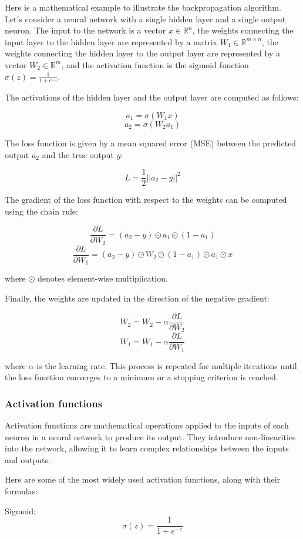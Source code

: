 \documentclass[12pt, a4paper, oneside]{article}
\begin{document}
Here is a mathematical example to illustrate the backpropagation algorithm. Let's consider a neural network with a single hidden layer and a single output neuron. The input to the network is a vector $x \in \mathbb{R}^n$, the weights connecting the input layer to the hidden layer are represented by a matrix $W_1 \in \mathbb{R}^{m \times n}$, the weights connecting the hidden layer to the output layer are represented by a vector $W_2 \in \mathbb{R}^m$, and the activation function is the sigmoid function $\sigma(z) = \frac{1}{1 + e^{-z}}$.

The activations of the hidden layer and the output layer are computed as follows:

$$ a_1 = \sigma(W_1x) $$
$$ a_2 = \sigma(W_2a_1) $$

The loss function is given by a mean squared error (MSE) between the predicted output $a_2$ and the true output $y$:

$$ L = \frac{1}{2} ||a_2 - y||^2 $$

The gradient of the loss function with respect to the weights can be computed using the chain rule:

$$ \frac{\partial L}{\partial W_2} = (a_2 - y) \odot a_1 \odot (1 - a_1) $$
$$ \frac{\partial L}{\partial W_1} = (a_2 - y) \odot W_2 \odot (1 - a_1) \odot a_1 \odot x $$

where $\odot$ denotes element-wise multiplication.

Finally, the weights are updated in the direction of the negative gradient:

$$ W_2 = W_2 - \alpha \frac{\partial L}{\partial W_2} $$
$$ W_1 = W_1 - \alpha \frac{\partial L}{\partial W_1} $$

where $\alpha$ is the learning rate. This process is repeated for multiple iterations until the loss function converges to a minimum or a stopping criterion is reached.
\subsubsection{Activation functions }
Activation functions are mathematical operations applied to the inputs of each neuron in a neural network to produce its output. They introduce non-linearities into the network, allowing it to learn complex relationships between the inputs and outputs.

Here are some of the most widely used activation functions, along with their formulas:

Sigmoid:
$$ \sigma(z) = \frac{1}{1 + e^{-z}} $$
\end{document}
